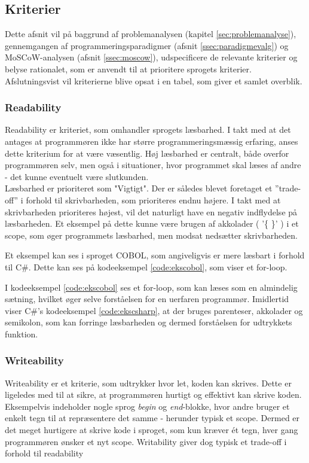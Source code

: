 \subsection{Kriterier}
\label{ssec:kriterier}
Dette afsnit vil på baggrund af problemanalysen (kapitel \ref{sec:problemanalyse}), gennemgangen af programmeringsparadigmer (afsnit \ref{ssec:paradigmevalg}) og MoSCoW-analysen (afsnit \ref{ssec:moscow}), udspecificere de relevante kriterier og belyse rationalet, som er anvendt til at prioritere sprogets kriterier. Afslutningsvist vil kriterierne blive opsat i en tabel, som giver et samlet overblik. 

\subsubsection{Readability} 
Readability er kriteriet, som omhandler sprogets læsbarhed. I takt med at det antages at programmøren ikke har større programmeringsmæssig erfaring, anses dette kriterium for at være væsentlig. Høj læsbarhed er centralt, både overfor programmøren selv, men også i situationer, hvor programmet skal læses af andre - det kunne eventuelt være slutkunden. \\

\noindent Læsbarhed er prioriteret som "Vigtigt". Der er således blevet foretaget et ”trade-off” i forhold til skrivbarheden, som prioriteres endnu højere. I takt med at skrivbarheden prioriteres højest, vil det naturligt have en negativ indflydelse på læsbarheden. Et eksempel på dette kunne være brugen af akkolader ( '\{ \}' ) i et scope, som øger programmets læsbarhed, men modsat nedsætter skrivbarheden. 

Et eksempel kan ses i sproget COBOL, som angiveligvis er mere læsbart i forhold til C\#. Dette kan ses på kodeeksempel \ref{code:ekscobol}, som viser et for-loop.


\noindent I kodeeksempel \ref{code:ekscobol} ses et for-loop, som kan læses som en almindelig sætning, hvilket øger selve forståelsen for en uerfaren programmør. Imidlertid viser C\#'s kodeeksempel \ref{code:ekscsharp}, at der bruges parenteser, akkolader og semikolon, som kan forringe læsbarheden og dermed forståelsen for udtrykkets funktion. 


\subsubsection{Writeability} 
Writeability er et kriterie, som udtrykker hvor let, koden kan skrives. Dette er ligeledes med til at sikre, at programmøren hurtigt og effektivt kan skrive koden. Eksempelvis indeholder nogle sprog \textit{begin} og \textit{end}-blokke, hvor andre bruger et enkelt tegn til at repræsentere det samme - herunder typisk et scope. Dermed er det meget hurtigere at skrive kode i sproget, som kun kræver ét tegn, hver gang programmøren ønsker et nyt scope. Writability giver dog typisk et trade-off i forhold til readability

